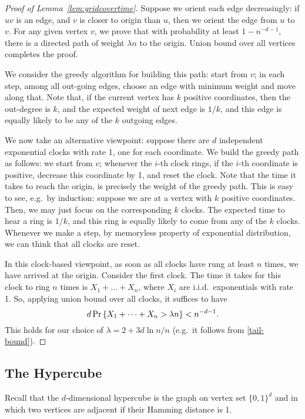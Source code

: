 \documentclass[lotsofwhite]{patmorin}
\begin{document}
\begin{proof}[Proof of Lemma~\ref{lem:gridcovertime}]
Suppose we orient each edge decreasingly:
if $uv$ is an edge, and $v$ is closer to origin than $u$,
then we orient the edge from $u$ to $v$.
For any given vertex $v$, we prove that with probability at least $1-n^{-d-1}$, there is a directed path of weight $\lambda n$ to the origin. Union bound over all vertices completes the proof.

We consider the greedy algorithm for building this path: start from $v$; in each step, among all out-going edges, choose an edge with minimum weight and move along that.
Note that, if the current vertex has $k$ positive coordinates, then the out-degree is $k$, and the expected weight of next edge is $1/k$,
and this edge is equally likely to be any of the $k$ outgoing edges.

We now take an alternative viewpoint:
suppose there are $d$ independent exponential clocks with rate 1, one for each coordinate.
We build the greedy path as follows:
we start from $v$;
whenever the $i$-th clock rings, if the $i$-th coordinate is positive, decrease this coordinate by 1, and reset the clock.
Note that the time it takes to reach the origin, is precisely the weight of the greedy path.
This is easy to see, e.g.\ by induction:
suppose we are at a vertex with $k$ positive coordinates.
Then, we may just focus on the corresponding $k$ clocks.
The expected time to hear a ring is $1/k$, and this ring is equally likely to come from any of the $k$ clocks.
Whenever we make a step, by memoryless property of exponential distribution, we can think that all clocks are reset.

In this clock-based viewpoint, as soon as all clocks have rung at least $n$ times, we have arrived at the origin.
Consider the first clock.
The time it takes for this clock to ring $n$ times is
$X_1+\dots+X_n$,
where $X_i$ are i.i.d.\ exponentials with rate 1.
So, applying union bound over all clocks, it suffices to have
$$d \Pr\left\{ X_1+\dots+X_n > \lambda n\right\} < n^{-d-1}.$$
This holds for our choice of $\lambda=2+3d \ln n/n$ (e.g.\ it follows from \eqref{tail-bound}).
\end{proof}

\subsection{The Hypercube}

Recall that the $d$-dimensional hypercube is the graph on vertex set
$\{0,1\}^d$ and in which two vertices are adjacent if their Hamming
distance is 1.
\end{document}
